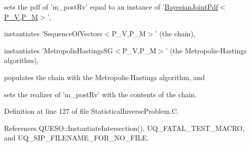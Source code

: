 \begin{DoxyEnumerate}
\item sets the pdf of 'm\-\_\-post\-Rv' equal to an instance of '\hyperlink{class_q_u_e_s_o_1_1_bayesian_joint_pdf}{Bayesian\-Joint\-Pdf$<$\-P\-\_\-\-V,\-P\-\_\-\-M$>$}', 
\item instantiates 'Sequence\-Of\-Vectors$<$\-P\-\_\-\-V,\-P\-\_\-\-M$>$' (the chain), 
\item instantiates 'Metropolis\-Hastings\-S\-G$<$\-P\-\_\-\-V,\-P\-\_\-\-M$>$' (the Metropolis-\/\-Hastings algorithm), 
\item populates the chain with the Metropolis-\/\-Hastings algorithm, and 
\item sets the realizer of 'm\-\_\-post\-Rv' with the contents of the chain. 
\end{DoxyEnumerate}

Definition at line 127 of file Statistical\-Inverse\-Problem.\-C.



References Q\-U\-E\-S\-O\-::\-Instantiate\-Intersection(), U\-Q\-\_\-\-F\-A\-T\-A\-L\-\_\-\-T\-E\-S\-T\-\_\-\-M\-A\-C\-R\-O, and U\-Q\-\_\-\-S\-I\-P\-\_\-\-F\-I\-L\-E\-N\-A\-M\-E\-\_\-\-F\-O\-R\-\_\-\-N\-O\-\_\-\-F\-I\-L\-E.


